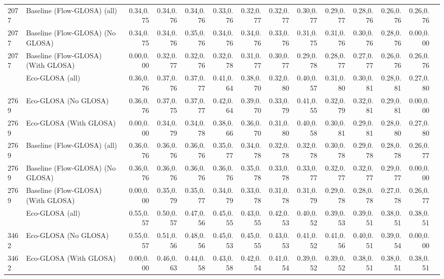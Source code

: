 \begin{table}[ht]
{\begin{tabular}{llrrrrrrrrrrrr}
        2077 & Baseline (Flow-GLOSA) (all)        & 0.34,0.75 & 0.34,0.76 & 0.34,0.76 & 0.33,0.76 & 0.32,0.77 & 0.32,0.77 & 0.30,0.77 & 0.29,0.77 & 0.28,0.76 & 0.26,0.76 & 0.26,0.76 \\
        2077 & Baseline (Flow-GLOSA) (No GLOSA)   & 0.34,0.75 & 0.34,0.76 & 0.35,0.76 & 0.34,0.76 & 0.34,0.76 & 0.33,0.76 & 0.31,0.75 & 0.31,0.76 & 0.30,0.76 & 0.28,0.76 & 0.00,0.00 \\
        2077 & Baseline (Flow-GLOSA) (With GLOSA) & 0.00,0.00 & 0.32,0.77 & 0.32,0.76 & 0.32,0.78 & 0.31,0.77 & 0.30,0.77 & 0.29,0.78 & 0.28,0.77 & 0.27,0.77 & 0.26,0.76 & 0.26,0.76 \\
        \addlinespace
        2769 & Eco-GLOSA (all)                    & 0.36,0.76 & 0.37,0.76 & 0.37,0.77 & 0.41,0.64 & 0.38,0.70 & 0.32,0.80 & 0.40,0.57 & 0.31,0.80 & 0.30,0.81 & 0.28,0.81 & 0.27,0.80 \\
        2769 & Eco-GLOSA (No GLOSA)               & 0.36,0.76 & 0.37,0.75 & 0.37,0.77 & 0.42,0.64 & 0.39,0.70 & 0.33,0.79 & 0.41,0.55 & 0.32,0.79 & 0.32,0.81 & 0.29,0.81 & 0.00,0.00 \\
        2769 & Eco-GLOSA (With GLOSA)             & 0.00,0.00 & 0.34,0.79 & 0.34,0.78 & 0.38,0.66 & 0.36,0.70 & 0.31,0.80 & 0.40,0.58 & 0.30,0.81 & 0.29,0.81 & 0.28,0.80 & 0.27,0.80 \\
        2769 & Baseline (Flow-GLOSA) (all)        & 0.36,0.76 & 0.36,0.76 & 0.36,0.76 & 0.35,0.77 & 0.34,0.78 & 0.32,0.78 & 0.32,0.78 & 0.30,0.78 & 0.29,0.78 & 0.28,0.78 & 0.26,0.77 \\
        2769 & Baseline (Flow-GLOSA) (No GLOSA)   & 0.36,0.76 & 0.36,0.76 & 0.36,0.76 & 0.36,0.76 & 0.35,0.78 & 0.33,0.78 & 0.33,0.77 & 0.32,0.77 & 0.32,0.77 & 0.29,0.77 & 0.00,0.00 \\
        2769 & Baseline (Flow-GLOSA) (With GLOSA) & 0.00,0.00 & 0.35,0.79 & 0.35,0.77 & 0.34,0.79 & 0.33,0.78 & 0.31,0.78 & 0.31,0.79 & 0.29,0.78 & 0.28,0.78 & 0.27,0.78 & 0.26,0.77 \\
        \addlinespace
        3462 & Eco-GLOSA (all)                    & 0.55,0.57 & 0.50,0.57 & 0.47,0.56 & 0.45,0.55 & 0.43,0.55 & 0.42,0.53 & 0.40,0.52 & 0.39,0.53 & 0.39,0.51 & 0.38,0.51 & 0.38,0.51 \\
        3462 & Eco-GLOSA (No GLOSA)               & 0.55,0.57 & 0.51,0.56 & 0.48,0.56 & 0.45,0.53 & 0.45,0.55 & 0.43,0.53 & 0.41,0.52 & 0.41,0.56 & 0.40,0.51 & 0.39,0.54 & 0.00,0.00 \\
        3462 & Eco-GLOSA (With GLOSA)             & 0.00,0.00 & 0.46,0.63 & 0.44,0.58 & 0.43,0.58 & 0.42,0.54 & 0.41,0.54 & 0.39,0.52 & 0.39,0.52 & 0.38,0.51 & 0.38,0.51 & 0.38,0.51 \\

\end{tabular}}
\end{table}
